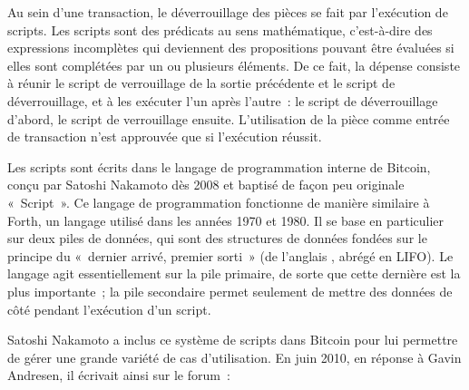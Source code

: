 
Au sein d'une transaction, le déverrouillage des pièces se fait par l'exécution de scripts. Les scripts sont des prédicats au sens mathématique, c'est-à-dire des expressions incomplètes qui deviennent des propositions pouvant être évaluées si elles sont complétées par un ou plusieurs éléments. De ce fait, la dépense consiste à réunir le script de verrouillage de la sortie précédente et le script de déverrouillage, et à les exécuter l'un après l'autre~: le script de déverrouillage d'abord, le script de verrouillage ensuite. L'utilisation de la pièce comme entrée de transaction n'est approuvée que si l'exécution réussit.

Les scripts sont écrits dans le langage de programmation interne de Bitcoin, conçu par Satoshi Nakamoto dès 2008 et baptisé de façon peu originale «~Script~». Ce langage de programmation fonctionne de manière similaire à Forth, un langage utilisé dans les années 1970 et 1980. Il se base en particulier sur deux piles de données, qui sont des structures de données fondées sur le principe du «~dernier arrivé, premier sorti~» (de l'anglais , abrégé en LIFO). Le langage agit essentiellement sur la pile primaire, de sorte que cette dernière est la plus importante~; la pile secondaire permet seulement de mettre des données de côté pendant l'exécution d'un script.

Satoshi Nakamoto a inclus ce système de scripts dans Bitcoin pour lui permettre de gérer une grande variété de cas d'utilisation. En juin 2010, en réponse à Gavin Andresen, il écrivait ainsi sur le forum~:

